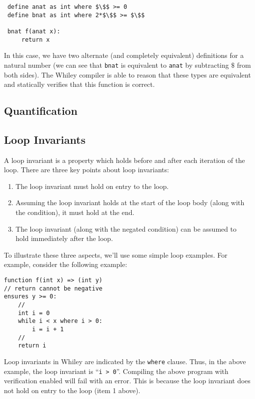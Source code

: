 \begin{lstlisting}
 define anat as int where $\$$ >= 0
 define bnat as int where 2*$\$$ >= $\$$

 bnat f(anat x):
     return x
\end{lstlisting}
In this case, we have two alternate (and completely equivalent)
definitions for a natural number (we can see that \lstinline{bnat} is
equivalent to \lstinline{anat} by subtracting $\$$ from both sides).
The Whiley compiler is able to reason that these types are equivalent
and statically verifies that this function is correct.

\subsection{Quantification}
\subsection{Loop Invariants}
\label{loop_invariants}

A loop invariant is a property which
holds before and after each iteration of the loop.  There are three
key points about loop invariants:
\begin{enumerate}
\item The loop invariant must hold on entry to the loop.
\item Assuming the loop invariant holds at the start of the loop body
  (along with the condition), it must hold at the end.
\item The loop invariant (along with the negated condition) can be
  assumed to hold immediately after the loop.
\end{enumerate}

To illustrate these three aspects, we'll use some simple loop
examples.  For example, consider the following example:

\begin{lstlisting}
function f(int x) => (int y)
// return cannot be negative
ensures y >= 0:
    //
    int i = 0
    while i < x where i > 0:
        i = i + 1 
    //
    return i
\end{lstlisting}

Loop invariants in Whiley are indicated by the \lstinline{where}
clause.  Thus, in the above example, the loop invariant is
``\lstinline{i > 0}''.  Compiling the above program with verification
enabled will fail with an error.   This is because the loop invariant
does not hold on entry to the loop (item 1 above).

